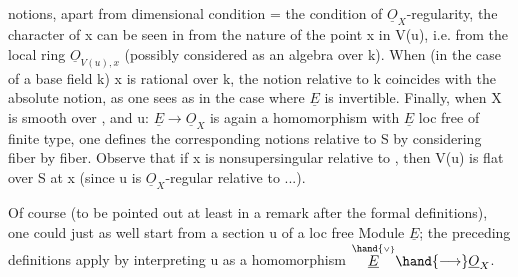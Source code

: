 
notions, apart from  dimensional condition = the condition of
$\underline{O}_X$-regularity, the character of x can be seen  in  from the nature of
the point x in V(u), i.e. from the local ring $\underline{O}_{V(u),x}$ (possibly considered
as an algebra over k). When (in the case of a base field k)
x is rational over k, the notion relative to k coincides with the absolute
notion, as one sees  as in the case where $\underline{E}$ is invertible. Finally,
when X is smooth over , and u: $\underline{E}\to\underline{O}_X$ is again a homomorphism with
$\underline{E}$ loc free of finite type, one defines the corresponding notions relative
to S by considering fiber by fiber. Observe that if x is
nonsupersingular relative to , then V(u) is flat over S  at
x (since u is $\underline{O}_X$-regular relative to  ...).

 Of course (to be pointed out at least in a remark after the
formal definitions), one could just as well start from a section u
of a loc free Module $\underline{E}$; the preceding definitions apply by
interpreting u as a homomorphism $\overset{\hand{\scriptscriptstyle\vee}}{\underline{E}}\hand{\longrightarrow}\underline{O}_X$.

